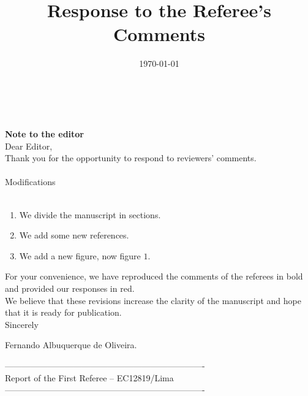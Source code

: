 \documentclass[prd,aps,nofootinbib]{revtex4}
\begin{document}
\title{Response to the Referee's Comments}

\date{\today }
\maketitle

\vspace{1cm}

\\
\\

{\bf Note to the editor} \\

Dear Editor,\\


Thank you for the opportunity to respond to reviewers' comments. \\
\\
Modifications\\
\\
\begin{enumerate}
    \item We divide the manuscript in sections.
    \item We add some new references.
\item We add a new figure, now figure $1$.
\end{enumerate}


For your convenience, we have reproduced the comments of the referees in bold and provided our responses in red.\\

We believe that these revisions increase the clarity of the manuscript and hope that it is ready for publication.\\


Sincerely

Fernando Albuquerque de Oliveira.

\vspace{2cm}

\newpage

\noindent

----------------------------------------------------------------------\\
Report of the First Referee -- EC12819/Lima\\
----------------------------------------------------------------------\\
\end{document}

